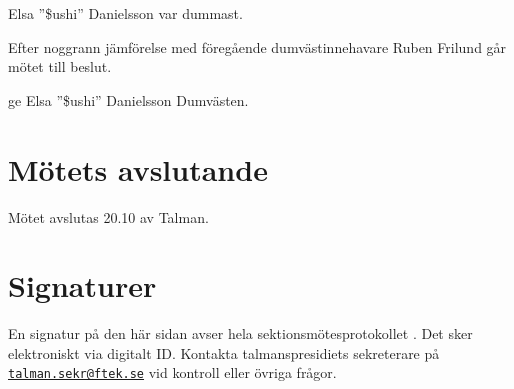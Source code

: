 \documentclass[hidelinks]{../sektionsmote} %
\begin{document}
\begin{beslut}
    \item Elsa ''\$ushi'' Danielsson var dummast.
\end{beslut}
Efter noggrann jämförelse med föregående dumvästinnehavare Ruben Frilund går mötet till beslut.
\begin{beslut}
    \item ge Elsa ''\$ushi'' Danielsson Dumvästen.
\end{beslut}


\section{Mötets avslutande}
Mötet avslutas 20.10 av Talman.

\clearpage
\section*{Signaturer}
\label{sec:sig}
En signatur på den här sidan avser hela sektionsmötesprotokollet \themote. Det sker elektroniskt via digitalt ID. Kontakta talmanspresidiets sekreterare på \href{mailto:talman.sekr@ftek.se}{\texttt{talman.sekr@ftek.se}} vid kontroll eller övriga frågor. 

\vspace{4cm}
\begin{center}
\end{center}
\end{document}
